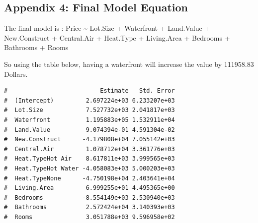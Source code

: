 \documentclass[letterpaper,9pt,twocolumn,twoside,]{pinp}
\begin{document}
\hypertarget{appendix-4-final-model-equation}{%
\subsection{\texorpdfstring{\textbf{Appendix 4: Final Model
Equation}}{Appendix 4: Final Model Equation}}\label{appendix-4-final-model-equation}}

The final model is : Price \textasciitilde{} Lot.Size + Waterfront +
Land.Value + New.Construct + Central.Air + Heat.Type + Living.Area +
Bedrooms + Bathrooms + Rooms

So using the table below, having a waterfront will increase the value by
111958.83 Dollars.

\begin{ShadedResult}
\begin{verbatim}
#                          Estimate   Std. Error
#  (Intercept)         2.697224e+03 6.233207e+03
#  Lot.Size            7.527732e+03 2.041817e+03
#  Waterfront          1.195883e+05 1.532911e+04
#  Land.Value          9.074394e-01 4.591304e-02
#  New.Construct      -4.179808e+04 7.055142e+03
#  Central.Air         1.078712e+04 3.361776e+03
#  Heat.TypeHot Air    8.617811e+03 3.999565e+03
#  Heat.TypeHot Water -4.058083e+03 5.000203e+03
#  Heat.TypeNone      -4.750198e+04 2.403641e+04
#  Living.Area         6.999255e+01 4.495365e+00
#  Bedrooms           -8.554149e+03 2.530940e+03
#  Bathrooms           2.572424e+04 3.140393e+03
#  Rooms               3.051788e+03 9.596958e+02
\end{verbatim}
\end{ShadedResult}

\end{document}
